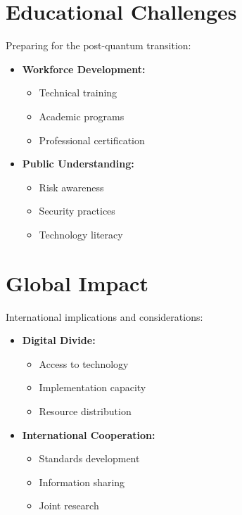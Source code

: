 \section{Educational Challenges}\label{sec:education}

Preparing for the post-quantum transition:

\begin{itemize}
    \item \textbf{Workforce Development:}
    \begin{itemize}
        \item Technical training
        \item Academic programs
        \item Professional certification
    \end{itemize}
    \item \textbf{Public Understanding:}
    \begin{itemize}
        \item Risk awareness
        \item Security practices
        \item Technology literacy
    \end{itemize}
\end{itemize}

\section{Global Impact}\label{sec:global}

International implications and considerations:

\begin{itemize}
    \item \textbf{Digital Divide:}
    \begin{itemize}
        \item Access to technology
        \item Implementation capacity
        \item Resource distribution
    \end{itemize}
    \item \textbf{International Cooperation:}
    \begin{itemize}
        \item Standards development
        \item Information sharing
        \item Joint research
    \end{itemize}
\end{itemize}

